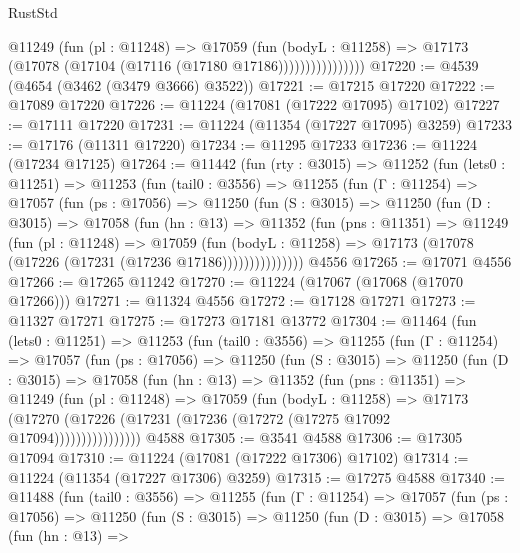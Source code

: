 \begin{lexlean}{RustStd}
\begin{coremodule}
                      @11249
                        (fun (pl : @11248) =>
                        @17059
                          (fun (bodyL : @11258) =>
                          @17173 (@17078 (@17104 (@17116 (@17180 @17186))))))))))))))))
@17220 := @4539 (@4654 (@3462 (@3479 @3666) @3522))
@17221 := @17215 @17220
@17222 := @17089 @17220
@17226 := @11224 (@17081 (@17222 @17095) @17102)
@17227 := @17111 @17220
@17231 := @11224 (@11354 (@17227 @17095) @3259)
@17233 := @17176 (@11311 @17220)
@17234 := @11295 @17233
@17236 := @11224 (@17234 @17125)
@17264 := @11442
    (fun (rty : @3015) =>
    @11252
      (fun (lets0 : @11251) =>
      @11253
        (fun (tail0 : @3556) =>
        @11255
          (fun (Γ : @11254) =>
          @17057
            (fun (ps : @17056) =>
            @11250
              (fun (S : @3015) =>
              @11250
                (fun (D : @3015) =>
                @17058
                  (fun (hn : @13) =>
                  @11352
                    (fun (pns : @11351) =>
                    @11249
                      (fun (pl : @11248) =>
                      @17059
                        (fun (bodyL : @11258) =>
                        @17173 (@17078 (@17226 (@17231 (@17236 @17186)))))))))))))))
    @4556
@17265 := @17071 @4556
@17266 := @17265 @11242
@17270 := @11224 (@17067 (@17068 (@17070 @17266)))
@17271 := @11324 @4556
@17272 := @17128 @17271
@17273 := @11327 @17271
@17275 := @17273 @17181 @13772
@17304 := @11464
    (fun (lets0 : @11251) =>
    @11253
      (fun (tail0 : @3556) =>
      @11255
        (fun (Γ : @11254) =>
        @17057
          (fun (ps : @17056) =>
          @11250
            (fun (S : @3015) =>
            @11250
              (fun (D : @3015) =>
              @17058
                (fun (hn : @13) =>
                @11352
                  (fun (pns : @11351) =>
                  @11249
                    (fun (pl : @11248) =>
                    @17059
                      (fun (bodyL : @11258) =>
                      @17173
                        (@17270
                          (@17226 (@17231 (@17236 (@17272 (@17275 @17092 @17094))))))))))))))))
    @4588
@17305 := @3541 @4588
@17306 := @17305 @17094
@17310 := @11224 (@17081 (@17222 @17306) @17102)
@17314 := @11224 (@11354 (@17227 @17306) @3259)
@17315 := @17275 @4588
@17340 := @11488
    (fun (tail0 : @3556) =>
    @11255
      (fun (Γ : @11254) =>
      @17057
        (fun (ps : @17056) =>
        @11250
          (fun (S : @3015) =>
          @11250
            (fun (D : @3015) =>
            @17058
              (fun (hn : @13) =>

\end{coremodule}
\end{lexlean}

